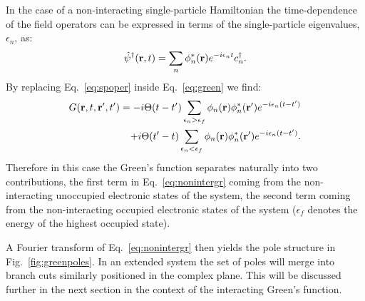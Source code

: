 In the case of a non-interacting single-particle Hamiltonian 
the time-dependence of the field operators can be expressed in terms of the 
single-particle eigenvalues, $\epsilon_{n}$, as:
%
\begin{equation}
\label{eq:spoper}
\hat{\psi}^{\dagger}({\bf r},t) = \sum_{n} \phi^{*}_{n}({\bf r})e^{-i\epsilon_{n}t} c^{\dagger}_{n}.
\end{equation}
%
By replacing Eq.~\ref{eq:spoper} inside Eq.~\ref{eq:green} we find:
%
\begin{align}
\label{eq:nonintergr}
G({\bf r},t,{\bf r^\prime}, t') = -i\Theta(t-t')\sum_{\epsilon_n>\epsilon_{f}}\phi_{n}({\bf r})\phi^{*}_{n}({\bf r^\prime})e^{-i\epsilon_{n}(t-t')} \nonumber \\
	        			  +i\Theta(t'-t)\sum_{\epsilon_n<\epsilon_{f}}\phi_{n}({\bf r})\phi^{*}_{n}({\bf r^\prime})e^{-i\epsilon_{n}(t-t')}.
\end{align}
%
Therefore in this case the Green's function separates naturally into 
two contributions, the first term in Eq.~\ref{eq:nonintergr} coming
from the non-interacting unoccupied electronic states of the system, the second term 
coming from the non-interacting occupied electronic states of the 
system ($\epsilon_{f}$ denotes the energy of the highest occupied state). 

A Fourier transform of Eq.~\ref{eq:nonintergr} then yields the pole structure in 
Fig.~\ref{fig:greenpoles}. In an extended system the set of poles will merge into
branch cuts similarly positioned in the complex plane.
This will be discussed further in the next section
in the context of the interacting Green's function.

